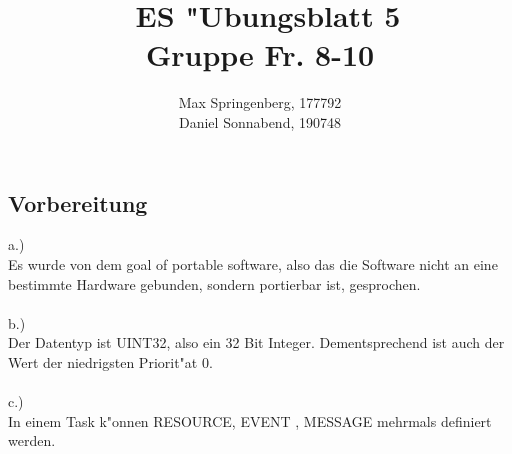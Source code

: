 \documentclass{article}
\author{Max Springenberg, 177792\\
        Daniel Sonnabend, 190748}
\title{\
    ES "Ubungsblatt 5\\
    Gruppe Fr. 8-10
    }
\date{}
\begin{document}
\maketitle
\newpage

\subsection{Vorbereitung}
a.)\\
Es wurde von dem \glqq goal of portable software\grqq, 
    also das die Software nicht an eine 
    bestimmte Hardware gebunden, sondern portierbar ist, gesprochen.\\
\\
b.)\\
Der Datentyp ist UINT32, also ein 32 Bit Integer.
    Dementsprechend ist auch der Wert der niedrigsten Priorit"at $0$.\\
\\
c.)\\
In einem Task k"onnen RESOURCE, EVENT , MESSAGE mehrmals definiert werden.\\
\end{document}
